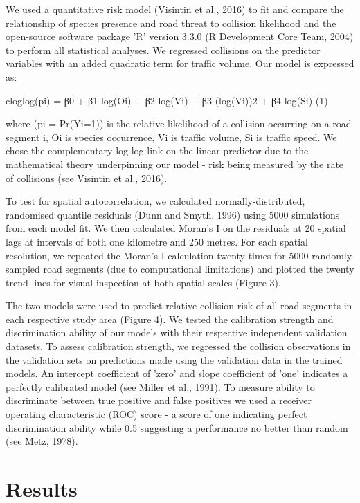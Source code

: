 We used a quantitative risk model (Visintin et al., 2016) to fit and compare the relationship of species presence and road threat to collision likelihood and the open-source software package ’R’ version 3.3.0 (R Development Core Team, 2004) to perform all statistical analyses. We regressed collisions on the predictor variables with an added quadratic term for traffic volume. Our model is expressed as:

cloglog(pi) = β0 + β1 log(Oi) + β2 log(Vi) + β3 (log(Vi))2 + β4 log(Si)			(1)

where (pi = Pr(Yi=1)) is the relative likelihood of a collision occurring on a road segment i, Oi is species occurrence, Vi is traffic volume, Si is traffic speed. We chose the complementary log-log link on the linear predictor due to the mathematical theory underpinning our model - risk being measured by the rate of collisions (see Visintin et al., 2016).

To test for spatial autocorrelation, we calculated normally-distributed, randomised quantile residuals (Dunn and Smyth, 1996) using 5000 simulations from each model fit. We then calculated Moran's I on the residuals at 20 spatial lags at intervals of both one kilometre and 250 metres.  For each spatial resolution, we repeated the Moran's I calculation twenty times for 5000 randomly sampled road segments (due to computational limitations) and plotted the twenty trend lines for visual inspection at both spatial scales (Figure 3).

The two models were used to predict relative collision risk of all road segments in each respective study area (Figure 4).  We tested the calibration strength and discrimination ability of our models with their respective independent validation datasets. To assess calibration strength, we regressed the collision observations in the validation sets on predictions made using the validation data in the trained models. An intercept coefficient of 'zero' and slope coefficient of 'one' indicates a perfectly calibrated model (see Miller et al., 1991). To measure ability to discriminate between true positive and false positives we used a receiver operating characteristic (ROC) score - a score of one indicating perfect discrimination ability while 0.5 suggesting a performance no better than random (see Metz, 1978).

\section{Results}

